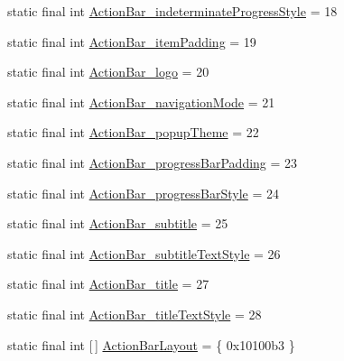 \begin{DoxyCompactItemize}
\item 
static final int \mbox{\hyperlink{classandroid_1_1support_1_1v7_1_1appcompat_1_1_r_1_1styleable_a7577229b463e9b7130c54def73c2afd7}{Action\+Bar\+\_\+indeterminate\+Progress\+Style}} = 18
\item 
static final int \mbox{\hyperlink{classandroid_1_1support_1_1v7_1_1appcompat_1_1_r_1_1styleable_a315cf68c96fdaec15e402b40dda940d7}{Action\+Bar\+\_\+item\+Padding}} = 19
\item 
static final int \mbox{\hyperlink{classandroid_1_1support_1_1v7_1_1appcompat_1_1_r_1_1styleable_a56f0a3f5be9ab67dec4dd2251204ba70}{Action\+Bar\+\_\+logo}} = 20
\item 
static final int \mbox{\hyperlink{classandroid_1_1support_1_1v7_1_1appcompat_1_1_r_1_1styleable_afedf914ccaf1bb5ca9002e42ed54d533}{Action\+Bar\+\_\+navigation\+Mode}} = 21
\item 
static final int \mbox{\hyperlink{classandroid_1_1support_1_1v7_1_1appcompat_1_1_r_1_1styleable_ad01a2a11a37482bb9449f38fbad79527}{Action\+Bar\+\_\+popup\+Theme}} = 22
\item 
static final int \mbox{\hyperlink{classandroid_1_1support_1_1v7_1_1appcompat_1_1_r_1_1styleable_a3d7a77efb74431150b14219b00be5bef}{Action\+Bar\+\_\+progress\+Bar\+Padding}} = 23
\item 
static final int \mbox{\hyperlink{classandroid_1_1support_1_1v7_1_1appcompat_1_1_r_1_1styleable_a6e926db9394b2fb80b912d0e660c879c}{Action\+Bar\+\_\+progress\+Bar\+Style}} = 24
\item 
static final int \mbox{\hyperlink{classandroid_1_1support_1_1v7_1_1appcompat_1_1_r_1_1styleable_a5c8269ff62c5e3b0abcaf99c6fe524b3}{Action\+Bar\+\_\+subtitle}} = 25
\item 
static final int \mbox{\hyperlink{classandroid_1_1support_1_1v7_1_1appcompat_1_1_r_1_1styleable_a781dc187d0cfb26129ebda2fdcaa0643}{Action\+Bar\+\_\+subtitle\+Text\+Style}} = 26
\item 
static final int \mbox{\hyperlink{classandroid_1_1support_1_1v7_1_1appcompat_1_1_r_1_1styleable_a19035537ac5f35fe63e49623336b62b3}{Action\+Bar\+\_\+title}} = 27
\item 
static final int \mbox{\hyperlink{classandroid_1_1support_1_1v7_1_1appcompat_1_1_r_1_1styleable_a77bef956ecd272f3533af6b1ca36854d}{Action\+Bar\+\_\+title\+Text\+Style}} = 28
\item 
static final int \mbox{[}$\,$\mbox{]} \mbox{\hyperlink{classandroid_1_1support_1_1v7_1_1appcompat_1_1_r_1_1styleable_a130715398cd11a55fefd1a376c18092e}{Action\+Bar\+Layout}} = \{ 0x10100b3 \}

\end{DoxyCompactItemize}
